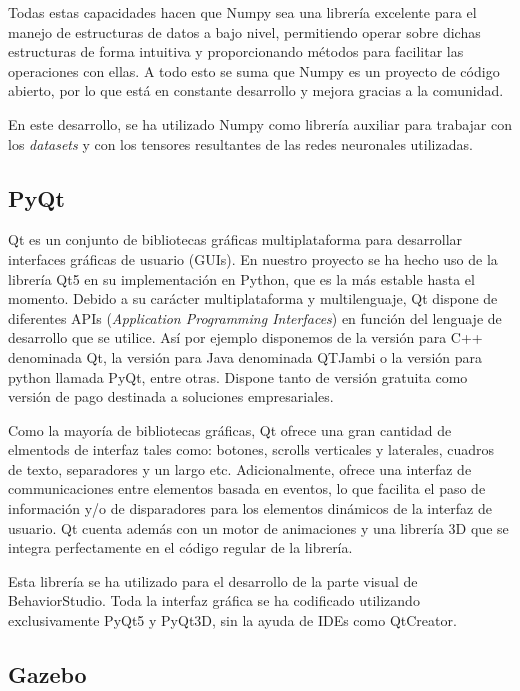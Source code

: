 Todas estas capacidades hacen que Numpy sea una librería excelente para el manejo de estructuras de datos a bajo nivel, permitiendo operar sobre dichas estructuras de forma intuitiva y proporcionando métodos para facilitar las operaciones con ellas. A todo esto se suma que Numpy es un proyecto de código abierto, por lo que está en constante desarrollo y mejora gracias a la comunidad.

En este desarrollo, se ha utilizado Numpy como librería auxiliar para trabajar con los \textit{datasets} y con los tensores resultantes de las redes neuronales utilizadas.


\subsection{PyQt}

Qt es un conjunto de bibliotecas gráficas multiplataforma para desarrollar interfaces gráficas de usuario (GUIs). En nuestro proyecto se ha hecho uso de la librería Qt5 en su implementación en Python, que es la más estable hasta el momento. Debido a su carácter multiplataforma y multilenguaje, Qt dispone de diferentes APIs (\textit{Application Programming Interfaces}) en función del lenguaje de desarrollo que se utilice. Así por ejemplo disponemos de la versión para C++ denominada Qt, la versión para Java denominada QTJambi o la versión para python llamada PyQt, entre otras. Dispone tanto de versión gratuita como versión de pago destinada a soluciones empresariales.

Como la mayoría de bibliotecas gráficas, Qt ofrece una gran cantidad de elmentods de interfaz tales como: botones, scrolls verticales y laterales, cuadros de texto, separadores y un largo etc. Adicionalmente, ofrece una interfaz de communicaciones entre elementos basada en eventos, lo que facilita el paso de información y/o de disparadores para los elementos dinámicos de la interfaz de usuario. Qt cuenta además con un motor de animaciones y una librería 3D que se integra perfectamente en el código regular de la librería.

Esta librería se ha utilizado para el desarrollo de la parte visual de BehaviorStudio. Toda la interfaz gráfica se ha codificado utilizando exclusivamente PyQt5 y PyQt3D, sin la ayuda de IDEs como QtCreator.

\subsection{Gazebo}


